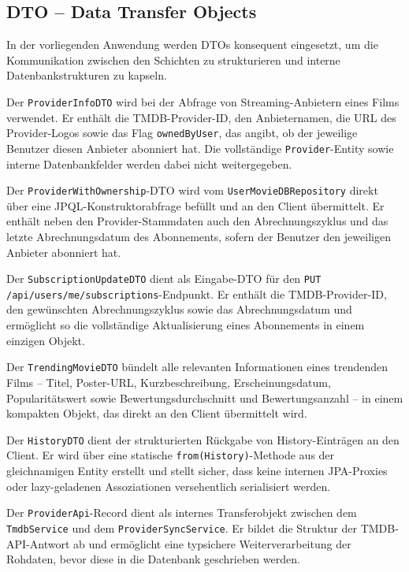 \subsection{DTO -- Data Transfer Objects}

In der vorliegenden Anwendung werden DTOs konsequent eingesetzt, um die
Kommunikation zwischen den Schichten zu strukturieren und interne
Datenbankstrukturen zu kapseln.

Der \texttt{ProviderInfoDTO} wird bei der Abfrage von Streaming-Anbietern
eines Films verwendet. Er enthält die TMDB-Provider-ID, den Anbieternamen,
die URL des Provider-Logos sowie das Flag \texttt{ownedByUser}, das angibt,
ob der jeweilige Benutzer diesen Anbieter abonniert hat. Die vollständige
\texttt{Provider}-Entity sowie interne Datenbankfelder werden dabei nicht
weitergegeben.

Der \texttt{ProviderWithOwnership}-DTO wird vom \texttt{UserMovieDBRepository}
direkt über eine JPQL-Konstruktorabfrage befüllt und an den Client
übermittelt. Er enthält neben den Provider-Stammdaten auch den
Abrechnungszyklus und das letzte Abrechnungsdatum des Abonnements, sofern
der Benutzer den jeweiligen Anbieter abonniert hat.

Der \texttt{SubscriptionUpdateDTO} dient als Eingabe-DTO für den
\texttt{PUT /api/users/me/subscriptions}-Endpunkt. Er enthält die
TMDB-Provider-ID, den gewünschten Abrechnungszyklus sowie das
Abrechnungsdatum und ermöglicht so die vollständige Aktualisierung eines
Abonnements in einem einzigen Objekt.

Der \texttt{TrendingMovieDTO} bündelt alle relevanten Informationen eines
trendenden Films -- Titel, Poster-URL, Kurzbeschreibung, Erscheinungsdatum,
Popularitätswert sowie Bewertungsdurchschnitt und Bewertungsanzahl -- in
einem kompakten Objekt, das direkt an den Client übermittelt wird.

Der \texttt{HistoryDTO} dient der strukturierten Rückgabe von
History-Einträgen an den Client. Er wird über eine statische
\texttt{from(History)}-Methode aus der gleichnamigen Entity erstellt und
stellt sicher, dass keine internen JPA-Proxies oder lazy-geladenen
Assoziationen versehentlich serialisiert werden.

Der \texttt{ProviderApi}-Record dient als internes Transferobjekt zwischen
dem \texttt{TmdbService} und dem \texttt{ProviderSyncService}. Er bildet
die Struktur der TMDB-API-Antwort ab und ermöglicht eine typsichere
Weiterverarbeitung der Rohdaten, bevor diese in die Datenbank geschrieben
werden.

